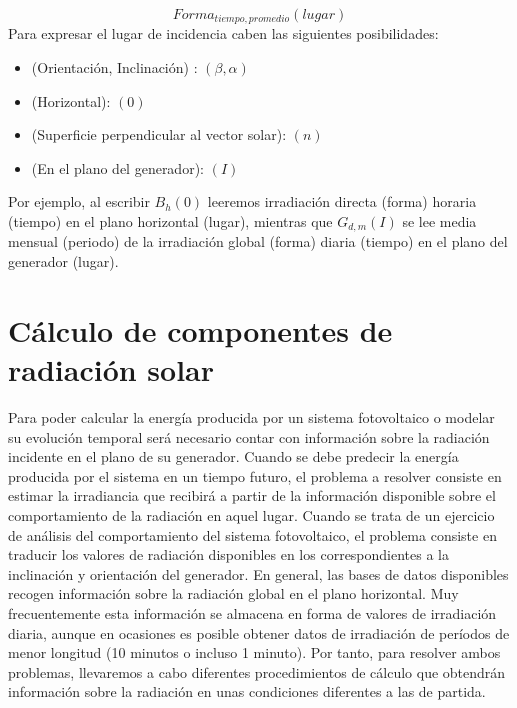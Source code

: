 \begin{equation}
Forma_{tiempo,promedio}(lugar)\label{eq:FormatoNomenclatura}\end{equation}
Para expresar el lugar de incidencia caben las siguientes posibilidades:
\begin{itemize}
\item (Orientación, Inclinación) : $(\beta,\alpha)$
\item (Horizontal): $(0)$
\item (Superficie perpendicular al vector solar): $(n)$
\item (En el plano del generador): $(I)$
\end{itemize}
Por ejemplo, al escribir $B_{h}(0)$ leeremos irradiación directa
(forma) horaria (tiempo) en el plano horizontal (lugar), mientras
que $G_{d,m}(I)$
se lee media mensual (periodo) de la irradiación global (forma) diaria
(tiempo) en el plano del generador (lugar).


\section{Cálculo de componentes de radiación solar}

Para poder calcular la energía producida por un sistema fotovoltaico
o modelar su evolución temporal será necesario contar con información
sobre la radiación incidente en el plano de su generador. Cuando se
debe predecir la energía producida por el sistema en un tiempo futuro,
el problema a resolver consiste en estimar la irradiancia que recibirá
a partir de la información disponible sobre el comportamiento de la
radiación en aquel lugar. Cuando se trata de un ejercicio de análisis
del comportamiento del sistema fotovoltaico, el problema consiste
en traducir los valores de radiación disponibles en los correspondientes
a la inclinación y orientación del generador. En general, las bases
de datos disponibles recogen información sobre la radiación global
en el plano horizontal. Muy frecuentemente esta información se almacena
en forma de valores de irradiación diaria, aunque en ocasiones es
posible obtener datos de irradiación de períodos de menor longitud
(10 minutos o incluso 1 minuto). Por tanto, para resolver ambos problemas,
llevaremos a cabo diferentes procedimientos de cálculo que obtendrán
información sobre la radiación en unas condiciones diferentes a las
de partida. 

